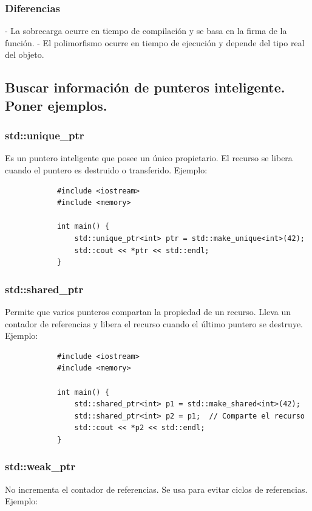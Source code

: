 \documentclass{article}
\begin{document}
            \subsubsection{Diferencias}
            - La sobrecarga ocurre en tiempo de compilación y se basa en la firma de la función.
            - El polimorfismo ocurre en tiempo de ejecución y depende del tipo real del objeto.

        \subsection{Buscar información de punteros inteligente. Poner ejemplos.} 
            \subsubsection{std::unique\_ptr}
            Es un puntero inteligente que posee un único propietario. El recurso se libera cuando el puntero es destruido o transferido. Ejemplo:
            
            \begin{verbatim}
            #include <iostream>
            #include <memory>
            
            int main() {
                std::unique_ptr<int> ptr = std::make_unique<int>(42);
                std::cout << *ptr << std::endl;
            }
            \end{verbatim}
            
            \subsubsection{std::shared\_ptr}
            Permite que varios punteros compartan la propiedad de un recurso. Lleva un contador de referencias y libera el recurso cuando el último puntero se destruye. Ejemplo:
            
            \begin{verbatim}
            #include <iostream>
            #include <memory>
            
            int main() {
                std::shared_ptr<int> p1 = std::make_shared<int>(42);
                std::shared_ptr<int> p2 = p1;  // Comparte el recurso
                std::cout << *p2 << std::endl;
            }
            \end{verbatim}
            
            \subsubsection{std::weak\_ptr}
            No incrementa el contador de referencias. Se usa para evitar ciclos de referencias. Ejemplo:
            
\end{document}
